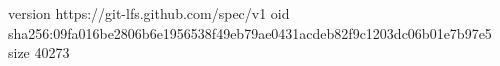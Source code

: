 version https://git-lfs.github.com/spec/v1
oid sha256:09fa016be2806b6e1956538f49eb79ae0431acdeb82f9c1203dc06b01e7b97e5
size 40273
